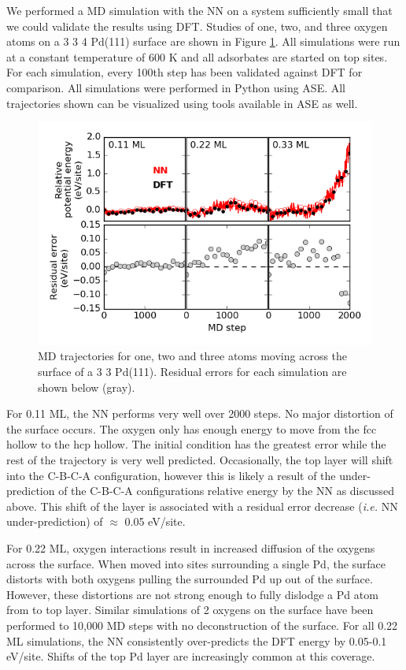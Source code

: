 \documentclass[12pt]{cmuthesis}
\begin{document}
We performed a MD simulation with the NN on a system sufficiently small that we could validate the results using DFT. Studies of one, two, and three oxygen atoms on a 3 \texttimes{} 3 \texttimes{} 4 Pd(111) surface are shown in Figure \ref{fig-PdO-MD}. All simulations were run at a constant temperature of 600 K and all adsorbates are started on top sites. For each simulation, every 100th step has been validated against DFT for comparison. All simulations were performed in Python using ASE. All trajectories shown can be visualized using tools available in ASE as well.

\begin{figure}[htbp]
\centering
\includegraphics[width=5in]{./images/PdO-MD.png}
\caption{\label{fig-PdO-MD}
MD trajectories for one, two and three atoms moving across the surface of a 3 \texttimes{} 3 Pd(111). Residual errors for each simulation are shown below (gray).}
\end{figure}

For 0.11 ML, the NN performs very well over 2000 steps. No major distortion of the surface occurs. The oxygen only has enough energy to move from the fcc hollow to the hcp hollow. The initial condition has the greatest error while the rest of the trajectory is very well predicted. Occasionally, the top layer will shift into the C-B-C-A configuration, however this is likely a result of the under-prediction of the C-B-C-A configurations relative energy by the NN as discussed above. This shift of the layer is associated with a residual error decrease (\emph{i.e.} NN under-prediction) of \(\approx\) 0.05 eV/site.

For 0.22 ML, oxygen interactions result in increased diffusion of the oxygens across the surface. When moved into sites surrounding a single Pd, the surface distorts with both oxygens pulling the surrounded Pd up out of the surface. However, these distortions are not strong enough to fully dislodge a Pd atom from to top layer. Similar simulations of 2 oxygens on the surface have been performed to 10,000 MD steps with no deconstruction of the surface. For all 0.22 ML simulations, the NN consistently over-predicts the DFT energy by 0.05-0.1 eV/site. Shifts of the top Pd layer are increasingly common at this coverage.
\end{document}
